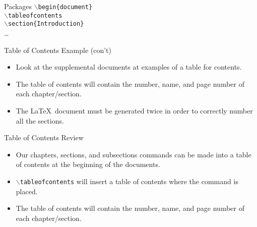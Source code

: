 \documentclass[pdf]{prosper}
\begin{document}
\begin{slide}{Packages}
	\texttt{$\backslash$begin\{document\}} \\
	\texttt{$\backslash$tableofcontents} \\
	\texttt{$\backslash$section\{Introduction\}} \\
	\ldots
\end{slide}
\begin{slide}{Table of Contents Example (con't)}
	\begin{itemize}
		\item Look at the supplemental documents at examples of a table for contents.
		\item The table of contents will contain the number, name, and page number of each chapter/section.
		\item The \LaTeX\ document must be generated twice in order to correctly number all the sections.
		
	\end{itemize}
\end{slide}
\begin{slide}{Table of Contents Review}
	\begin{itemize}
		\item Our chapters, sections, and subsections commands can be made into a table of contents at the beginning of the documents.
		\item \texttt{$\backslash$tableofcontents} will insert a table of contents where the command is placed.
		\item The table of contents will contain the number, name, and page number of each chapter/section.
	\end{itemize}
\end{slide}
\end{document}
